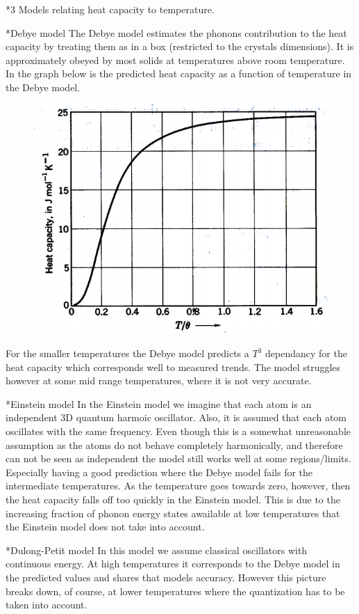 \documentclass[a4paper]{article}
\begin{document}
\begin{section}*3
	Models relating heat capacity to temperature.
	\begin{subsection}*{Debye model}
		The Debye model estimates the phonons contribution to the heat capacity by treating them as in a box (restricted to the crystals dimensions). It is approximately obeyed by most solids at temperatures above room temperature.
		In the graph below is the predicted heat capacity as a function of temperature in the Debye model.
		\begin{figure}[H]
			\includegraphics[width = 0.8\linewidth]{debye_graph.png}
			\centering
		\end{figure}
		For the smaller temperatures the Debye model predicts a $T^3$ dependancy for the heat capacity which corresponds well to measured trends. The model struggles however at some mid range temperatures, where it is not very accurate.
	\end{subsection}
	\begin{subsection}*{Einstein model}
		In the Einstein model we imagine that each atom is an independent 3D quantum harmoic oscillator. Also, it is assumed that each atom oscillates with the same frequency. Even though this is a somewhat unreasonable assumption as the atoms do not behave completely harmonically, and therefore can not be seen as independent the model still works well at some regions/limits. Especially having a good prediction where the Debye model fails for the intermediate temperatures. As the temperature goes towards zero, however, then the heat capacity falls off too quickly in the Einstein model. This is due to the increasing fraction of phonon energy states awailable at low temperatures that the Einstein model does not take into account. 
	\end{subsection}
	\begin{subsection}*{Dulong-Petit model}
		In this model we assume classical oscillators with continuous energy. At high temperatures it corresponds to the Debye model in the predicted values and shares that models accuracy. However this picture breaks down, of course, at lower temperatures where the quantization has to be taken into account. 
	\end{subsection}


\end{section}
\end{document}
